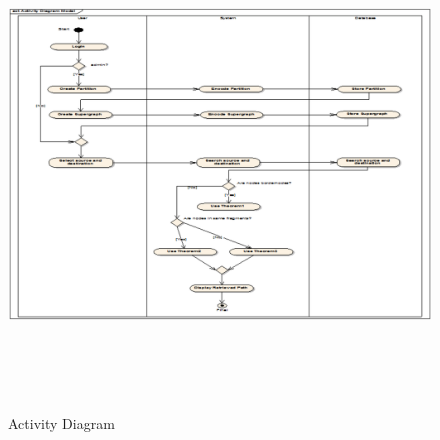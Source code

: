 \begin{center}
\begin{figure}[H]
\includegraphics[width=16cm,height=13cm]{act.eps}
\caption{Activity Diagram}
\end{figure}
\end{center}
